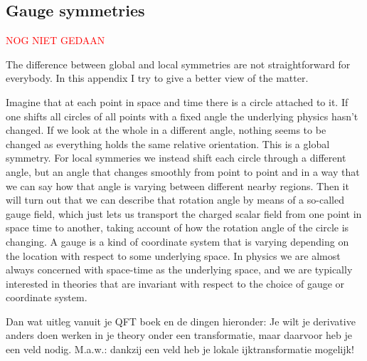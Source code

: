 \begin{appendices}
\chapter{Gauge symmetries}
\label{ch:gauge}
\textcolor{red}{NOG NIET GEDAAN}

The difference between global and local symmetries are not straightforward for everybody. In this appendix I try to give a better view of the matter.

Imagine that at each point in space and time there is a circle attached to it. If one shifts all circles of all points with a fixed angle the underlying physics hasn't changed. If we look at the whole in a different angle, nothing seems to be changed as everything holds the same relative orientation. This is a global symmetry. For local symmeries we instead shift each circle through a different angle, but an angle that changes smoothly from point to point and in a way that we can say how that angle is varying between different nearby regions. Then it will turn out that we can describe that rotation angle by means of a so-called gauge field, which just lets us transport the charged scalar field from one point in space time to another, taking account of how the rotation angle of the circle is changing. A gauge is a kind of coordinate system that is varying depending on the location with respect to some underlying space. In physics we are almost always concerned with space-time as the underlying space, and we are typically interested in theories that are invariant with respect to the choice of gauge or coordinate system. 

Dan wat uitleg vanuit je QFT boek en de dingen hieronder:
Je wilt je derivative anders doen werken in je theory onder een transformatie, maar daarvoor heb je een veld nodig. M.a.w.: dankzij een veld heb je lokale ijktransformatie mogelijk!




\end{appendices}
